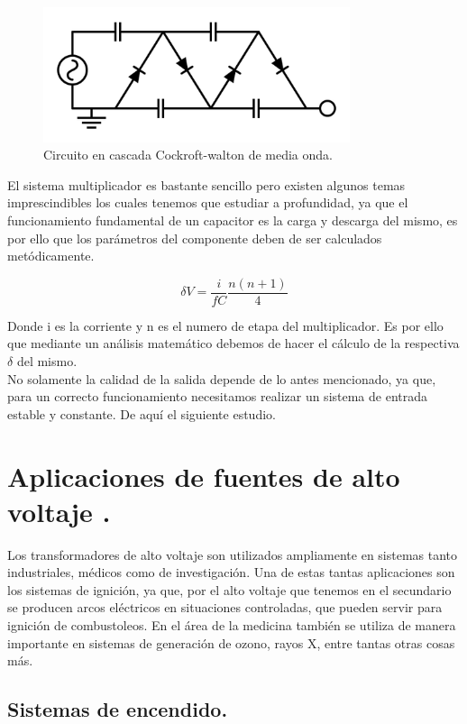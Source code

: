 \begin{figure}[H]
\centering
\includegraphics[width=9cm]{capitulo2/figs/circ.png}
\caption{ Circuito en cascada Cockroft-walton de media onda.}
\end{figure}
El sistema multiplicador es bastante sencillo pero existen algunos temas imprescindibles los cuales tenemos que estudiar a profundidad, ya que el funcionamiento fundamental de un capacitor es la carga y descarga del mismo, es por ello que los parámetros del componente deben de ser calculados metódicamente.


\begin{equation}
\delta V=\frac{i}{fC}\frac{n(n+1)}{4}
\end{equation}



Donde i es la corriente y n es el numero de etapa del multiplicador. Es por ello que mediante un análisis matemático debemos de hacer el cálculo de la respectiva $\delta$ del mismo.\\
No solamente la calidad de la salida depende de lo antes mencionado, ya que, para un correcto funcionamiento necesitamos realizar un sistema de entrada estable y constante. De aquí el siguiente estudio.
\newpage
\section{Aplicaciones de fuentes de alto voltaje .}

Los transformadores de alto voltaje son utilizados ampliamente en sistemas tanto industriales, médicos como de investigación. Una de estas tantas aplicaciones son los sistemas de ignición, ya que, por el alto voltaje que tenemos en el secundario se producen arcos eléctricos en situaciones controladas, que pueden servir para ignición de combustoleos. En el área de la medicina también se utiliza de manera importante en sistemas de generación de ozono, rayos X, entre tantas otras cosas más.  \\


\subsection{Sistemas de encendido.}


